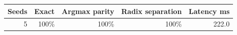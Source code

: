 \begin{tabular}{rrrrr}
\toprule
Seeds & Exact & Argmax parity & Radix separation & Latency ms \\
\midrule
5 & 100\% & 100\% & 100\% & 222.0 \\
\bottomrule
\end{tabular}
